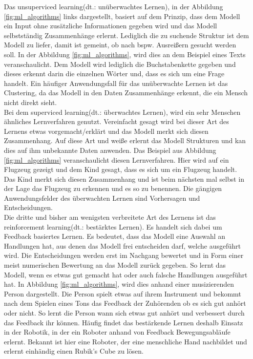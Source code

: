 \begin{onehalfspace}
        Das \glqq{}unsuperviced learning\grqq{}(\ac*{dt}.: unüberwachtes Lernen), in der Abbildung \ref*{fig:ml_algorithms} links dargestellt, basiert auf dem Prinzip, dass dem Modell ein Input ohne zusätzliche Informationen gegeben wird und das Modell selbstständig Zusammenhänge erlernt. Lediglich die zu suchende Struktur ist dem Modell zu liefer, damit ist gemeint, ob nach bspw. Ausreißern gesucht werden soll. In der Abbildung  \ref*{fig:ml_algorithms}, wird dies an dem Beispiel eines Texts veranschaulicht. Dem Modell wird lediglich die Buchstabenkette gegeben und dieses erkennt darin die einzelnen Wörter und, dass es sich um eine Frage handelt. Ein häufiger Anwendungsfall für das unüberwachte Lernen ist das Clustering, da das Modell in den Daten Zusammenhänge erkennt, die ein Mensch nicht direkt sieht.\cite{Datenkommission2019}\cite{Döbel2018} \\
        Bei dem \glqq{}superviced learning\grqq{}(\ac*{dt}.: überwachtes Lernen), wird ein sehr Menschen ähnliches Lernverfahren genutzt. Vereinfacht gesagt wird bei dieser Art des Lernens etwas vorgemacht/erklärt und das Modell merkt sich diesen Zusammenhang. Auf diese Art und weiße erlernt das Modell Strukturen und kan dies auf ihm unbekannte Daten anwenden. Das Beispiel aus Abbildung \ref*{fig:ml_algorithms} veranschaulicht diesen Lernverfahren. Hier wird auf ein Flugzeug gezeigt und dem Kind gesagt, dass es sich um ein Flugzeug handelt. Das Kind merkt sich diesen Zusammenhang und ist beim nächsten mal selbst in der Lage das Flugzeug zu erkennen und es so zu benennen. Die gängigen Anwendungsfelder des überwachten Lernen sind Vorhersagen und Entscheidungen.\cite{Döbel2018} \\
        Die dritte und bisher am wenigsten verbreitete Art des Lernens ist das \glqq{}reinforcement learning\grqq{}(\ac*{dt}.: bestärktes Lernen). Es handelt sich dabei um Feedback basiertes Lernen. Es bedeutet, dass das Modell eine Auswahl an Handlungen hat, aus denen das Modell frei entscheiden darf, welche ausgeführt wird. Die Entscheidungen werden erst im Nachgang bewertet und in Form einer meist numerischen Bewertung an das Modell zurück gegeben. So lernt das Modell, wenn es etwas gut gemacht hat oder auch falsche Handlungen ausgeführt hat. In Abbildung \ref*{fig:ml_algorithms}, wird dies anhand einer musizierenden Person dargestellt. Die Person spielt etwas auf ihrem Instrument und bekommt nach dem Spielen eines Tons das Feedback der Zuhörenden ob es sich gut anhört oder nicht. So lernt die Person wann sich etwas gut anhört und verbessert durch das Feedback ihr können. Häufig findet das bestärkende Lernen deshalb Einsatz in der Robotik, in der ein Roboter anhand von Feedback Bewegungsabläufe erlernt. Bekannt ist hier eine Roboter, der eine menschliche Hand nachbildet und erlernt einhändig einen Rubik’s Cube zu lösen.\cite{Horn2022}\cite{Döbel2018}\cite{Rubik2019}

\end{onehalfspace}
